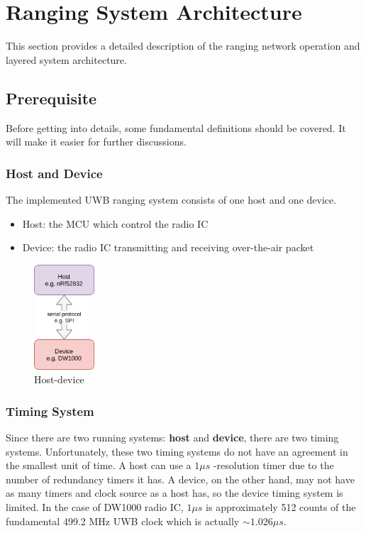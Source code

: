 \documentclass[\main/thesis.tex]{subfiles}
\begin{document}
\graphicspath{{img/}{03_firmware/img/}}

\chapter{Ranging System Architecture}
This section provides a detailed description of the ranging network operation and layered system architecture.

\section{Prerequisite}
Before getting into details, some fundamental definitions should be covered. It will make it easier for further discussions. 

\subsection{Host and Device}
The implemented UWB ranging system consists of one host and one device.
\begin{itemize}
    \item Host: the MCU which control the radio IC 
    \item Device: the radio IC transmitting and receiving over-the-air packet
\end{itemize}

\begin{figure}[H]
    \begin{center}
        \includegraphics[width=0.2\textwidth]{host_device.png}
    \end{center}
    \caption{Host-device}
    \label{fig:host_device}
\end{figure}

\subsection{Timing System}
\label{subsec:timing_system_subsection}
Since there are two running systems: \textbf{host} and \textbf{device}, there are two timing systems. Unfortunately, these two timing systems do not have an agreement in the smallest unit of time. A host can use a $1\mu s$ -resolution timer due to the number of redundancy timers it has. A device, on the other hand, may not have as many timers and clock source as a host has, so the device timing system is limited. In the case of DW1000 radio IC, $1\mu s$ is approximately 512 counts of the fundamental 499.2 MHz UWB clock which is actually \textbf{$\sim 1.026\mu s$}. 
\end{document}
